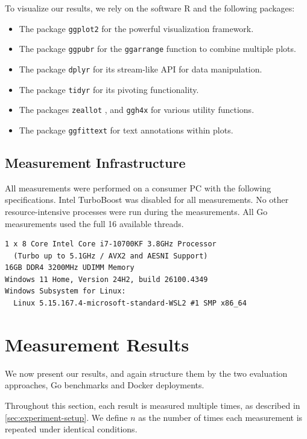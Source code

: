 To visualize our results, we rely on the software R \cite{R-core} and the following packages:
\begin{itemize}
    \item The package \texttt{ggplot2} \cite{R-ggplot2} for the powerful visualization framework.
    \item The package \texttt{ggpubr} \cite{R-ggpubr} for the \texttt{ggarrange} function to combine multiple plots.
    \item The package \texttt{dplyr} \cite{R-dplyr} for its stream-like API for data manipulation.
    \item The package \texttt{tidyr} \cite{R-tidyr} for its pivoting functionality.
    \item The packages \texttt{zeallot} \cite{R-zeallot}, and \texttt{ggh4x} \cite{R-ggh4x} for various utility functions.
    \item The package \texttt{ggfittext} \cite{R-ggfittext} for text annotations within plots.
\end{itemize}

\subsection{Measurement Infrastructure}

All measurements were performed on a consumer PC with the following specifications. Intel TurboBoost was disabled for all measurements. No other resource-intensive processes were run during the measurements. All Go measurements used the full 16 available threads.
\begin{lstlisting}[language=none,numbers=none]
1 x 8 Core Intel Core i7-10700KF 3.8GHz Processor
  (Turbo up to 5.1GHz / AVX2 and AESNI Support)
16GB DDR4 3200MHz UDIMM Memory
Windows 11 Home, Version 24H2, build 26100.4349
Windows Subsystem for Linux:
  Linux 5.15.167.4-microsoft-standard-WSL2 #1 SMP x86_64
\end{lstlisting}

\section{Measurement Results} \label{sec:measurement-results}

We now present our results, and again structure them by the two evaluation approaches, Go benchmarks and Docker deployments.

Throughout this section, each result is measured multiple times, as described in \cref{sec:experiment-setup}. We define $n$ as the number of times each measurement is repeated under identical conditions.

